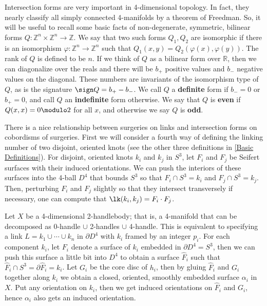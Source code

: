 Intersection forms are very important in 4-dimensional topology. In fact, they nearly classify all simply connected 4-manifolds by a theorem of Freedman. So, it will be useful to recall some basic facts of non-degenerate, symmetric, bilinear forms $Q : \mathbb Z^n \times \mathbb Z^n \rightarrow \mathbb Z$. We say that two such forms $Q_1,Q_2$ are isomorphic if there is an isomorphism $\varphi : \mathbb Z^n \rightarrow \mathbb Z^n$ such that $Q_1(x,y) = Q_2(\varphi(x),\varphi(y))$. The rank of $Q$ is defined to be $n$. If we think of $Q$ as a bilinear form over $\mathbb R$, then we can diagonalize over the reals and there will be $b_+$ positive values and $b_-$ negative values on the diagonal. These numbers are invariants of the isomorphism type of $Q$, as is the signature $\sign Q = b_+-b_-$. We call $Q$ a \textbf{definite} form if $b_-=0$ or $b_+=0$, and call $Q$ an \textbf{indefinite} form otherwise. We say that $Q$ is \textbf{even} if $Q(x,x)=0 \modulo 2$ for all $x$, and otherwise we say $Q$ is \textbf{odd}.

There is a nice relationship between surgeries on links and intersection forms on cobordisms of surgeries. First we will consider a fourth way of defining the linking number of two disjoint, oriented knots (see the other three definitions in \cref{Basic Definitions}). For disjoint, oriented knots $k_i$ and $k_j$ in $S^3$, let $F_i$ and $F_j$ be Seifert surfaces with their induced orientations. We can push the interiors of these surfaces into the 4-ball $D^4$ that bounds $S^3$ so that $F_i \cap S^3 = k_i$ and $F_j \cap S^3 = k_j$. Then, perturbing $F_i$ and $F_j$ slightly so that they intersect transversely if necessary, one can compute that $\lk(k_i,k_j) = F_i \cdot F_j$. 

Let $X$ be a 4-dimensional 2-handlebody; that is, a 4-manifold that can be decomposed as 0-handle $\cup$ 2-handles $\cup$ 4-handle. This is equivalent to specifying a link $L = k_1 \cup \cdots \cup k_n$ in $\partial D^4$ with $k_i$ framed by an integer $p_i$. For each component $k_i$, let $F_i$ denote a surface of $k_i$ embedded in $\partial D^4 = S^3$, then we can push this surface a little bit into $D^4$ to obtain a surface $\hat F_i$ such that $\hat F_i \cap S^3 = \partial \hat F_i = k_i$. Let $G_i$ be the core disc of $h_i$, then by gluing $\hat F_i$ and $G_i$ together along $k_i$ we obtain a closed, oriented, smoothly embedded surface $\alpha_i$ in $X$. Put any orientation on $k_i$, then we get induced orientations on $\hat F_i$ and $G_i$, hence $\alpha_i$ also gets an induced orientation.

